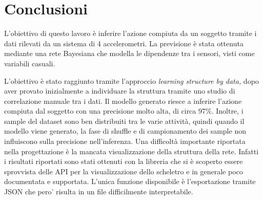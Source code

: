\documentclass[12pt]{article}
\begin{document}
\section{Conclusioni}
L'obiettivo di questo lavoro è inferire l'azione compiuta da un soggetto tramite i dati rilevati da un sistema di 4 accelerometri. La previsione è stata ottenuta mediante una rete Bayesiana che modella le dipendenze tra i sensori, visti come variabili casuali.\par L'obiettivo è stato raggiunto tramite l'approccio \textit{learning structure by data,} dopo aver provato inizialmente a individuare la struttura tramite uno studio di correlazione manuale tra i dati. Il modello generato riesce a inferire l'azione compiuta dal soggetto con una precisione molto alta, di circa 97\%. Inoltre, i sample del dataset sono ben distribuiti tra le varie attività, quindi quando il modello viene generato, la fase di shuffle e di campionamento dei sample non influiscono sulla precisione nell'inferenza. Una difficoltà importante riportata nella progettazione è la mancata visualizzazione della struttura della rete. Infatti i risultati riportati sono stati ottenuti con la libreria \cite{pomegranate} che si è scoperto essere sprovvista delle API per la visualizzazione dello scheletro e in generale poco documentata e supportata. L'unica funzione disponibile è l'esportazione tramite JSON che pero' risulta in un file difficilmente interpretabile.
\newpage


\end{document}
